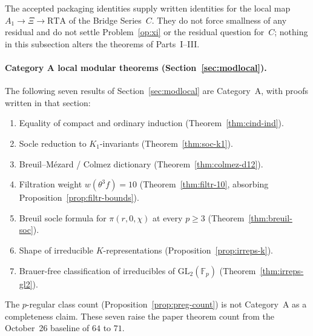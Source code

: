 \begin{remark}
The accepted packaging identities supply written identities for the local map $A_1\to\Xi\to\mathrm{RTA}$ of the Bridge Series~$C$. They do not force smallness of any residual and do not settle Problem~\ref{op:xi} or the residual question for~$C$; nothing in this subsection alters the theorems of Parts~I--III.
\end{remark}


\paragraph{Category A local modular theorems (Section~\ref{sec:modlocal}).}
The following seven results of Section~\ref{sec:modlocal} are Category~A, with proofs written in that section:
\begin{enumerate}
\item Equality of compact and ordinary induction (Theorem~\ref{thm:cind-ind}).
\item Socle reduction to $K_1$-invariants (Theorem~\ref{thm:soc-k1}).
\item Breuil--M\'ezard / Colmez dictionary (Theorem~\ref{thm:colmez-d12}).
\item Filtration weight $w(\theta^3 f)=10$ (Theorem~\ref{thm:filtr-10}, absorbing Proposition~\ref{prop:filtr-bounds}).
\item Breuil socle formula for $\pi(r,0,\chi)$ at every $p\ge3$ (Theorem~\ref{thm:breuil-soc}).
\item Shape of irreducible $K$-representations (Proposition~\ref{prop:irreps-k}).
\item Brauer-free classification of irreducibles of $\mathrm{GL}_2(\mathbb{F}_p)$ (Theorem~\ref{thm:irreps-gl2}).
\end{enumerate}
The $p$-regular class count (Proposition~\ref{prop:preg-count}) is not Category~A as a completeness claim. These seven raise the paper theorem count from the October~26 baseline of $64$ to $71$.

